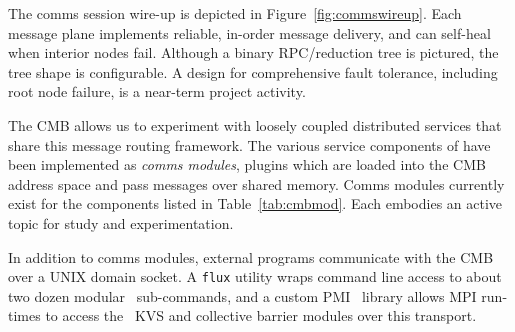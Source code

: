 The comms session wire-up is depicted in Figure~\ref{fig:commswireup}.
Each message plane implements reliable, in-order message delivery, and
can self-heal when interior nodes fail.
Although a binary RPC/reduction tree is pictured, the tree shape is
configurable.
A design for comprehensive fault tolerance, including root node failure,
is a near-term project activity.

The CMB allows us to experiment with loosely coupled distributed services
that share this message routing framework. The various service components
of \flux have
been implemented as {\em comms modules}, plugins which are loaded into the
CMB address space and pass messages over shared memory.
Comms modules currently exist for the components listed
in Table~\ref{tab:cmbmod}.
Each embodies an active topic for study and experimentation.

In addition to comms modules, external programs communicate with the CMB
over a UNIX domain socket.  A {\tt flux} utility wraps command line access
to about two dozen modular \flux\ sub-commands, and a custom PMI~\cite{PMI2}
library allows MPI run-times to access the \flux\ KVS and collective barrier
modules over this transport.

